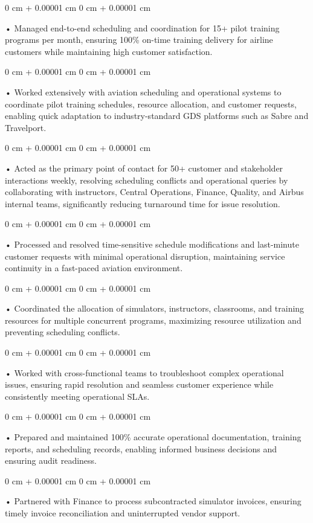 \documentclass[10pt, letterpaper]{article}
\newenvironment{onecolentry}{
    \begin{adjustwidth}{
        0 cm + 0.00001 cm
    }{
        0 cm + 0.00001 cm
    }
}{
    \end{adjustwidth}
} %
\begin{document}
        \begin{onecolentry}
             • Managed end-to-end scheduling and coordination for 15+ pilot training programs per month, ensuring 100\% on-time training delivery for airline customers while maintaining high customer satisfaction.
        \end{onecolentry}
        \begin{onecolentry}
             • Worked extensively with aviation scheduling and operational systems to coordinate pilot training schedules, resource allocation, and customer requests, enabling quick adaptation to industry-standard GDS platforms such as Sabre and Travelport.
        \end{onecolentry}
        \begin{onecolentry}
             • Acted as the primary point of contact for 50+ customer and stakeholder interactions weekly, resolving scheduling conflicts and operational queries by collaborating with instructors, Central Operations, Finance, Quality, and Airbus internal teams, significantly reducing turnaround time for issue resolution.
        \end{onecolentry}
        \begin{onecolentry}
             • Processed and resolved time-sensitive schedule modifications and last-minute customer requests with minimal operational disruption, maintaining service continuity in a fast-paced aviation environment.
        \end{onecolentry}
        \begin{onecolentry}
             • Coordinated the allocation of simulators, instructors, classrooms, and training resources for multiple concurrent programs, maximizing resource utilization and preventing scheduling conflicts.
        \end{onecolentry}
        \begin{onecolentry}
             • Worked with cross-functional teams to troubleshoot complex operational issues, ensuring rapid resolution and seamless customer experience while consistently meeting operational SLAs.
        \end{onecolentry}
        \begin{onecolentry}
             • Prepared and maintained 100\% accurate operational documentation, training reports, and scheduling records, enabling informed business decisions and ensuring audit readiness.
        \end{onecolentry}
        \begin{onecolentry}
             • Partnered with Finance to process subcontracted simulator invoices, ensuring timely invoice reconciliation and uninterrupted vendor support.
        \end{onecolentry}
\end{document}
